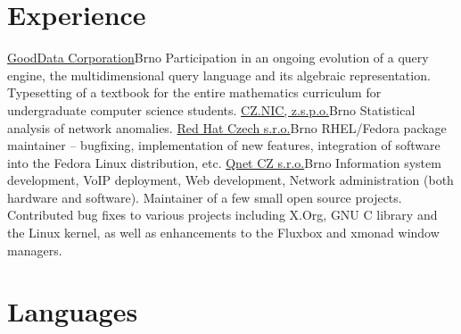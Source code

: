 \documentclass[11pt,a4paper]{moderncv}
\begin{document}
\section{Experience}
    {\href{http://gooddata.com/}{GoodData Corporation}}{Brno}{}
    {Participation in an ongoing evolution of a query engine, the
    multidimensional query language and its algebraic representation.}
    {Typesetting of a textbook for the entire mathematics curriculum for
    undergraduate computer science students.}
    {\href{http://labs.nic.cz/}{CZ.NIC, z.s.p.o.}}{Brno}{}
    {Statistical analysis of network anomalies.}
%
%
    {\href{http://www.cz.redhat.com/}{Red Hat Czech s.r.o.}}{Brno}{}
    {RHEL/Fedora package maintainer -- bugfixing, implementation of new
    features, integration of software into the Fedora Linux distribution,
    etc.}
%
    {\href{http://www.qnet.cz/}{Qnet CZ s.r.o.}}{Brno}{}
    {Information system development, VoIP deployment, Web development, Network
    administration (both hardware and software).}
%
    {Maintainer of a few small open source projects. Contributed bug fixes to
    various projects including X.Org, GNU C library and the Linux kernel, as
    well as enhancements to the Fluxbox and xmonad window managers.}


\section{Languages}
\end{document}
